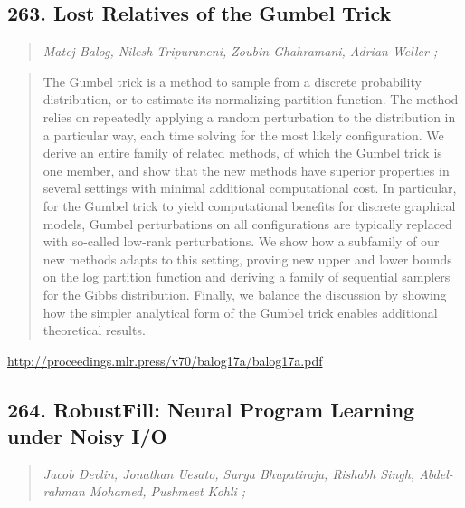 \documentclass{article}
\begin{document}
\subsection{263. Lost Relatives of the Gumbel Trick}

\begin{quote}
\footnotesize{\textit{Matej Balog, Nilesh Tripuraneni, Zoubin Ghahramani, Adrian Weller ;}}
\end{quote}

\begin{quote}
    The Gumbel trick is a method to sample from a discrete probability distribution, or to estimate its normalizing partition function. The method relies on repeatedly applying a random perturbation to the distribution in a particular way, each time solving for the most likely configuration. We derive an entire family of related methods, of which the Gumbel trick is one member, and show that the new methods have superior properties in several settings with minimal additional computational cost. In particular, for the Gumbel trick to yield computational benefits for discrete graphical models, Gumbel perturbations on all configurations are typically replaced with so-called low-rank perturbations. We show how a subfamily of our new methods adapts to this setting, proving new upper and lower bounds on the log partition function and deriving a family of sequential samplers for the Gibbs distribution. Finally, we balance the discussion by showing how the simpler analytical form of the Gumbel trick enables additional theoretical results.  \end{quote}

\href{http://proceedings.mlr.press/v70/balog17a/balog17a.pdf}{http://proceedings.mlr.press/v70/balog17a/balog17a.pdf}

\subsection{264. RobustFill: Neural Program Learning under Noisy I/O}

\begin{quote}
\footnotesize{\textit{Jacob Devlin, Jonathan Uesato, Surya Bhupatiraju, Rishabh Singh, Abdel-rahman Mohamed, Pushmeet Kohli ;}}
\end{quote}
\end{document}
